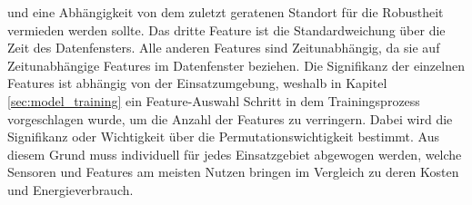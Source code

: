 und eine Abhängigkeit von dem zuletzt geratenen Standort für die Robustheit vermieden werden sollte.
Das dritte Feature ist die Standardweichung über die Zeit des Datenfensters.
Alle anderen Features sind Zeitunabhängig, da sie auf Zeitunabhängige Features im Datenfenster beziehen.
\newline
\newline
Die Signifikanz der einzelnen Features ist abhängig von der Einsatzumgebung, weshalb in Kapitel \ref{sec:model_training}
ein Feature-Auswahl Schritt in dem Trainingsprozess vorgeschlagen wurde, um die Anzahl der Features zu verringern.
Dabei wird die Signifikanz oder Wichtigkeit über die Permutationswichtigkeit bestimmt.
Aus diesem Grund muss individuell für jedes Einsatzgebiet abgewogen werden, welche Sensoren und Features am meisten Nutzen bringen
im Vergleich zu deren Kosten und Energieverbrauch.
